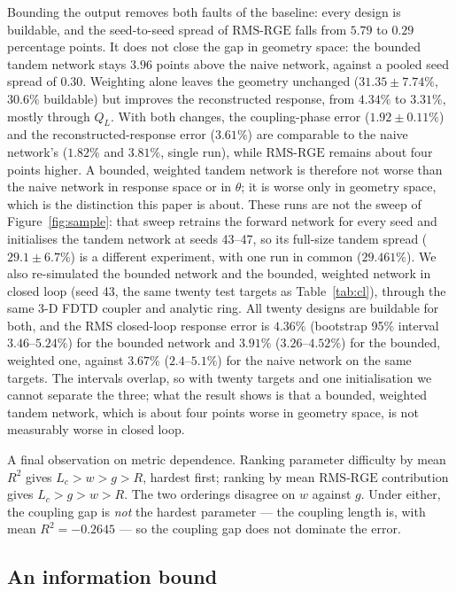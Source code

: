 \documentclass[11pt]{article}
\newcommand{\QL}{Q_L}
\newcommand{\rge}{\mathrm{RMS\text{-}RGE}}
\begin{document}
Bounding the output removes both faults of the baseline: every design is buildable, and the seed-to-seed spread of $\rge$ falls from $5.79$ to $0.29$ percentage points. It does not close the gap in geometry space: the bounded tandem network stays $3.96$ points above the naive network, against a pooled seed spread of $0.30$. Weighting alone leaves the geometry unchanged ($31.35 \pm 7.74\%$, $30.6\%$ buildable) but improves the reconstructed response, from $4.34\%$ to $3.31\%$, mostly through $\QL$. With both changes, the coupling-phase error ($1.92 \pm 0.11\%$) and the reconstructed-response error ($3.61\%$) are comparable to the naive network's ($1.82\%$ and $3.81\%$, single run), while $\rge$ remains about four points higher. A bounded, weighted tandem network is therefore not worse than the naive network in response space or in $\theta$; it is worse only in geometry space, which is the distinction this paper is about. These runs are not the sweep of Figure~\ref{fig:sample}: that sweep retrains the forward network for every seed and initialises the tandem network at seeds 43--47, so its full-size tandem spread ($29.1 \pm 6.7\%$) is a different experiment, with one run in common ($29.461\%$). We also re-simulated the bounded network and the bounded, weighted network in closed loop (seed 43, the same twenty test targets as Table~\ref{tab:cl}), through the same 3-D FDTD coupler and analytic ring. All twenty designs are buildable for both, and the RMS closed-loop response error is $4.36\%$ (bootstrap 95\% interval $3.46$--$5.24\%$) for the bounded network and $3.91\%$ ($3.26$--$4.52\%$) for the bounded, weighted one, against $3.67\%$ ($2.4$--$5.1\%$) for the naive network on the same targets. The intervals overlap, so with twenty targets and one initialisation we cannot separate the three; what the result shows is that a bounded, weighted tandem network, which is about four points worse in geometry space, is not measurably worse in closed loop.

A final observation on metric dependence. Ranking parameter difficulty by mean
$R^2$ gives $L_c > w > g > R$, hardest first; ranking by mean $\rge$
contribution gives $L_c > g > w > R$. The two orderings disagree on $w$
against $g$. Under either, the coupling gap is \emph{not} the hardest
parameter --- the coupling length is, with mean $R^2 = -0.2645$ --- so the coupling gap does not dominate the error.

\subsection{An information bound}
\end{document}
